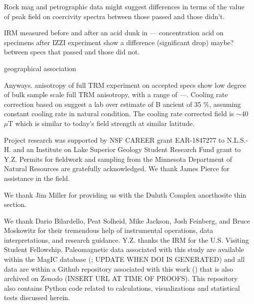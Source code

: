 \documentclass[draft]{agujournal2019}
\begin{document}
Rock mag and petrographic data might suggest differences in terms of the value of peak field on coercivity spectra between those passed and those didn't.  

IRM measured before and after an acid dunk in --- concentration acid on specimens after IZZI experiment show a difference (significant drop) maybe? between specs that passed and those did not.

geographical association

Anyways. anisotropy of full TRM experiment on accepted specs show low degree of bulk sample scale full TRM anisotropy, with a range of ---. Cooling rate correction based on \cite{Halgedahl1980a} suggest a lab over estimate of B ancient of 35 \%, assuming constant cooling rate in natural condition. The cooling rate corrected field is $\sim$40 $\mu$T which is similar to today's field strength at similar latitude. 

\acknowledgments
Project research was supported by NSF CAREER grant EAR-1847277 to N.L.S.-H. and an Institute on Lake Superior Geology Student Research Fund grant to Y.Z. Permits for fieldwork and sampling from the Minnesota Department of Natural Resources are gratefully acknowledged. We thank James Pierce for assistance in the field.

We thank Jim Miller for providing us with the Duluth Complex anorthosite thin section. 

We thank Dario Bilardello, Peat Solheid, Mike Jackson, Josh Feinberg, and Bruce Moskowitz for their tremendous help of instrumental operations, data interpretations, and research guidance. Y.Z. thanks the IRM for the U.S. Visiting Student Fellowship. Paleomagnetic data associated with this study are available within the MagIC database (\url{}; UPDATE WHEN DOI IS GENERATED) and all data are within a Github repository associated with this work (\url{}) that is also archived on Zenodo (INSERT URL AT TIME OF PROOFS). This repository also contains Python code related to calculations, visualizations and statistical tests discussed herein.  


\end{document}
